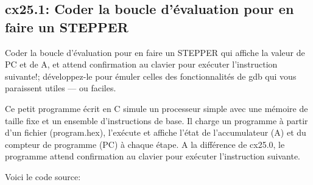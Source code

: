 \documentclass[a4paper,11pt]{article}
\begin{document}
        \begin{figure}[ht]
        \end{figure}

      \newpage
      \subsection{cx25.1: Coder la boucle d'évaluation pour en faire un STEPPER}
        \noindent Coder la boucle d'évaluation pour en faire un STEPPER qui affiche la valeur de PC et de A, et
        attend confirmation au clavier pour exécuter l'instruction suivante!; développez-le pour
        émuler celles des fonctionnalités de gdb qui vous paraissent utiles — ou faciles.

        \bigskip
        \noindent Ce petit programme écrit en C simule un processeur simple avec une mémoire de taille fixe et un ensemble d'instructions de base. 
        Il charge un programme à partir d'un fichier (program.hex), l'exécute et affiche l'état de l'accumulateur (A) et du compteur de programme (PC) 
        à chaque étape. A la différence de cx25.0, le programme attend confirmation au clavier pour exécuter l'instruction suivante.

        \newpage
        \noindent Voici le code source:
        
\end{document}
